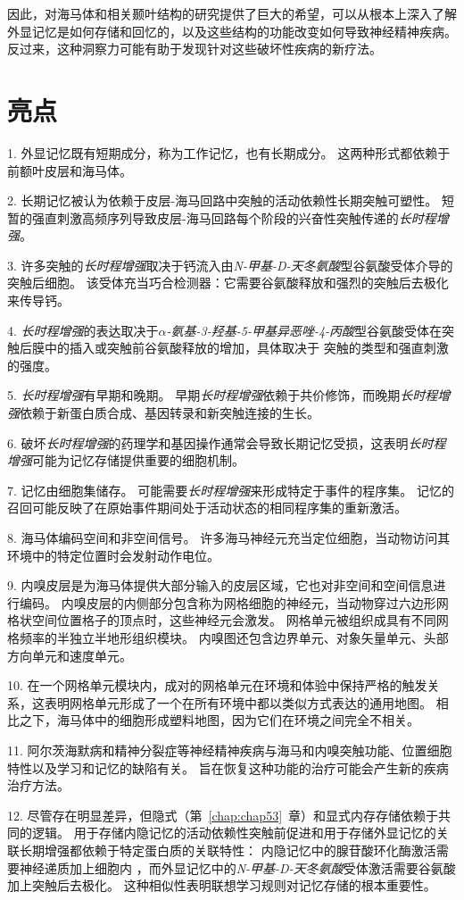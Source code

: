 因此，对海马体和相关颞叶结构的研究提供了巨大的希望，可以从根本上深入了解外显记忆是如何存储和回忆的，以及这些结构的功能改变如何导致神经精神疾病。
反过来，这种洞察力可能有助于发现针对这些破坏性疾病的新疗法。



\section{亮点}

1. 外显记忆既有短期成分，称为工作记忆，也有长期成分。
这两种形式都依赖于前额叶皮层和海马体。 


2. 长期记忆被认为依赖于皮层-海马回路中突触的活动依赖性长期突触可塑性。
短暂的强直刺激高频序列导致皮层-海马回路每个阶段的兴奋性突触传递的\textit{长时程增强}。


3. 许多突触的\textit{长时程增强}取决于钙流入由\textit{N-甲基-D-天冬氨酸}型谷氨酸受体介导的突触后细胞。
该受体充当巧合检测器：它需要谷氨酸释放和强烈的突触后去极化来传导钙。 


4. \textit{长时程增强}的表达取决于\textit{$\alpha$-氨基-3-羟基-5-甲基异恶唑-4-丙酸}型谷氨酸受体在突触后膜中的插入或突触前谷氨酸释放的增加，具体取决于 突触的类型和强直刺激的强度。


5. \textit{长时程增强}有早期和晚期。
早期\textit{长时程增强}依赖于共价修饰，而晚期\textit{长时程增强}依赖于新蛋白质合成、基因转录和新突触连接的生长。


6. 破坏\textit{长时程增强}的药理学和基因操作通常会导致长期记忆受损，这表明\textit{长时程增强}可能为记忆存储提供重要的细胞机制。


7. 记忆由细胞集储存。
可能需要\textit{长时程增强}来形成特定于事件的程序集。
记忆的召回可能反映了在原始事件期间处于活动状态的相同程序集的重新激活。


8. 海马体编码空间和非空间信号。
许多海马神经元充当定位细胞，当动物访问其环境中的特定位置时会发射动作电位。


9. 内嗅皮层是为海马体提供大部分输入的皮层区域，它也对非空间和空间信息进行编码。
内嗅皮层的内侧部分包含称为网格细胞的神经元，当动物穿过六边形网格状空间位置格子的顶点时，这些神经元会激发。
网格单元被组织成具有不同网格频率的半独立半地形组织模块。
内嗅图还包含边界单元、对象矢量单元、头部方向单元和速度单元。


10. 在一个网格单元模块内，成对的网格单元在环境和体验中保持严格的触发关系，这表明网格单元形成了一个在所有环境中都以类似方式表达的通用地图。
相比之下，海马体中的细胞形成塑料地图，因为它们在环境之间完全不相关。


11. 阿尔茨海默病和精神分裂症等神经精神疾病与海马和内嗅突触功能、位置细胞特性以及学习和记忆的缺陷有关。
旨在恢复这种功能的治疗可能会产生新的疾病治疗方法。 


12. 尽管存在明显差异，但隐式（第~\ref{chap:chap53}~章）和显式内存存储依赖于共同的逻辑。
用于存储内隐记忆的活动依赖性突触前促进和用于存储外显记忆的关联长期增强都依赖于特定蛋白质的关联特性：
内隐记忆中的腺苷酸环化酶激活需要神经递质加上细胞内 ，而外显记忆中的\textit{N-甲基-D-天冬氨酸}受体激活需要谷氨酸 加上突触后去极化。
这种相似性表明联想学习规则对记忆存储的根本重要性。






